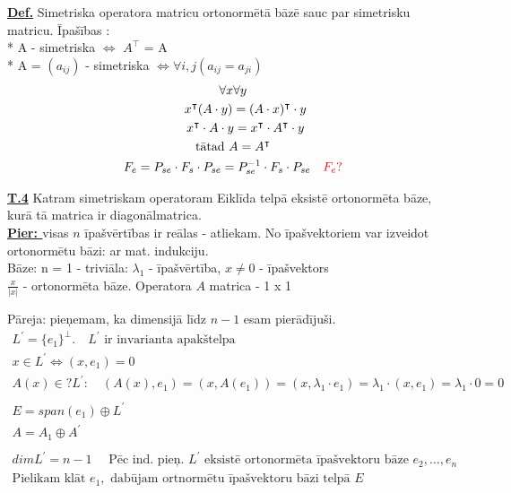 \documentclass[12pt]{article}
\begin{document}
\textbf{\underline{Def.}} Simetriska operatora matricu ortonormētā bāzē sauc par simetrisku matricu.
Īpašības : \\
* A - simetriska  $\Leftrightarrow$ $A^{\intercal}$ = A \\
* A = $(a_{ij})$ - simetriska $\Leftrightarrow \forall i,j (a_{ij} = a_{ji})$  \\

\begin{gather*}
	\forall x \forall y \\
	\quad \quad x^{\intercal} (A \cdot y) = (A \cdot x)^{\intercal} \cdot y \\
	\quad \quad x^{\intercal} \cdot A \cdot y = x^{\intercal} \cdot A^{\intercal} \cdot y \\
	\text{tātad } A = A^{\intercal}
	\\
	F_e = P_{se} \cdot F_s \cdot P_{se}  = P_{se}^{-1} \cdot F_s \cdot P_{se} \color{red}{\quad F_e?}
\end{gather*}

\pagebreak

\textbf{\underline{T.4}}  Katram simetriskam operatoram Eiklīda telpā eksistē ortonormēta bāze, kurā tā matrica ir diagonālmatrica. \\

\textbf{\underline{Pier: }}  visas $n$ īpašvērtības ir reālas - atliekam. No īpašvektoriem var izveidot ortonormētu bāzi: ar mat. indukciju. \\

Bāze: n = 1 - triviāla: $\lambda_1$ - īpašvērtība, $x \neq 0$ - īpašvektors \\

$\frac{x}{|x|}$ - ortonormēta bāze.  Operatora $A$ matrica - 1 x 1 %

Pāreja: pieņemam, ka dimensijā līdz $n - 1$ esam pierādījuši. \\
\begin{gather*}
	L^{'} = \{e_1\}^\bot. \quad L^{'} \text{ ir invarianta apakštelpa} \\
	x \in L^{'} \Leftrightarrow (x, e_1) = 0 \\
	A(x) \in ? L^{'} : \quad (A(x), e_1) = (x, A(e_1)) = (x, \lambda_1 \cdot e_1) = \lambda_1 \cdot (x, e_1) =  \lambda_1 \cdot 0 = 0 \\ %
	\\
	E = span(e_1) \oplus L^{'} \\
	A = A_1 \oplus A^{'} \\
	\\
	dimL^{'} = n - 1 \quad  \text{ Pēc ind. pieņ. } L^{'} \text{ eksistē ortonormēta īpašvektoru bāze } e_2, \ldots, e_n \\
	\text{Pielikam klāt } e_1, \text{ dabūjam ortnormētu īpašvektoru bāzi telpā } E
\end{gather*}
\end{document}
